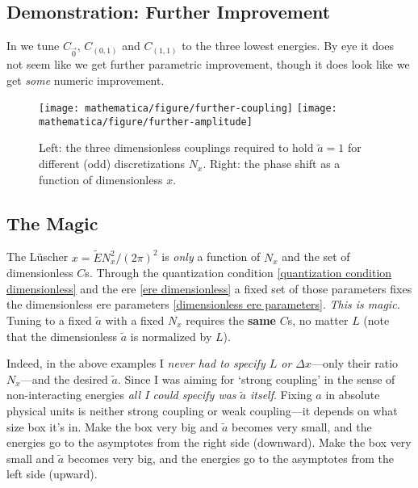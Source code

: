 \subsection{Demonstration: Further Improvement}

In  we tune $C_{\vec{0}}$, $C_{(0,1)}$ and $C_{(1,1)}$ to the three lowest energies.
By eye it does not seem like we get further parametric improvement, though it does look like we get \emph{some} numeric improvement.

\begin{figure}
	\texttt{[image: mathematica/figure/further-coupling]}
	\texttt{[image: mathematica/figure/further-amplitude]}
	\caption{
		Left: the three dimensionless couplings required to hold $\tilde{a}=1$ for different (odd) discretizations $N_x$.
		Right: the phase shift as a function of dimensionless $x$.
	}
    \label{fig:tune three spheres}
\end{figure}

\subsection{The Magic}

The L\"{u}scher $x=\tilde{E} N_x^2 /(2\pi)^2$ is \emph{only} a function of $N_x$ and the set of dimensionless $C$s.
Through the quantization condition \eqref{quantization condition dimensionless} and the ere \eqref{ere dimensionless} a fixed set of those parameters fixes the dimensionless ere parameters \eqref{dimensionless ere parameters}.
\emph{This is magic.}
Tuning to a fixed $\tilde{a}$ with a fixed $N_x$ requires the \textbf{same} $C$s, no matter $L$ (note that the dimensionless $\tilde{a}$ is normalized by $L$).

Indeed, in the above examples I \emph{never had to specify $L$ or $\Delta x$}---only their ratio $N_x$---and the desired $\tilde{a}$.
Since I was aiming for `strong coupling' in the sense of non-interacting energies \emph{all I could specify was $\tilde{a}$ itself}.
Fixing $a$ in absolute physical units is neither strong coupling or weak coupling---it depends on what size box it's in.
Make the box very big and $\tilde{a}$ becomes very small, and the energies go to the asymptotes from the right side (downward).
Make the box very small and $\tilde{a}$ becomes very big, and the energies go to the asymptotes from the left  side (upward).
